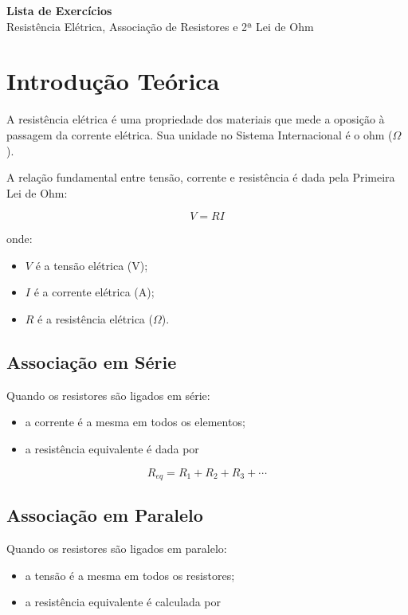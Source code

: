 \documentclass[12pt,a4paper]{article}
\begin{document}
\begin{center}
{\LARGE \textbf{Lista de Exercícios}}\\[0.2cm]
{\Large Resistência Elétrica, Associação de Resistores e 2ª Lei de Ohm}
\end{center}

\vspace{0.5cm}

\section*{Introdução Teórica}

A resistência elétrica é uma propriedade dos materiais que mede a oposição à passagem da corrente elétrica. Sua unidade no Sistema Internacional é o ohm ($\Omega$).

A relação fundamental entre tensão, corrente e resistência é dada pela Primeira Lei de Ohm:

\[
V = RI
\]

onde:

\begin{itemize}
\item $V$ é a tensão elétrica (V);
\item $I$ é a corrente elétrica (A);
\item $R$ é a resistência elétrica ($\Omega$).
\end{itemize}

\subsection*{Associação em Série}

Quando os resistores são ligados em série:

\begin{itemize}
\item a corrente é a mesma em todos os elementos;
\item a resistência equivalente é dada por
\end{itemize}

\[
R_{eq}=R_1+R_2+R_3+\cdots
\]

\subsection*{Associação em Paralelo}

Quando os resistores são ligados em paralelo:

\begin{itemize}
\item a tensão é a mesma em todos os resistores;
\item a resistência equivalente é calculada por
\end{itemize}
\end{document}
